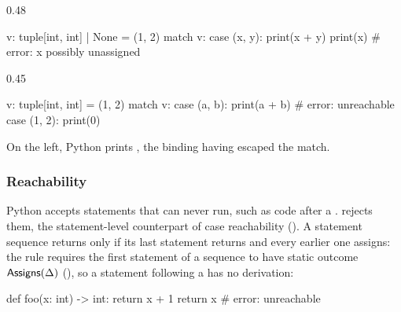 \begin{listingrow}
\begin{listingcol}{0.48\textwidth}
\begin{python}
v: tuple[int, int] | None = (1, 2)
match v:
    case (x, y):
        print(x + y)
print(x)  # error: x possibly unassigned
\end{python}
\end{listingcol}
\begin{listingcol}{0.45\textwidth}
\begin{python}
v: tuple[int, int] = (1, 2)
match v:
    case (a, b):
        print(a + b)
    # error: unreachable
    case (1, 2):
        print(0)
\end{python}
\end{listingcol}
\end{listingrow}

\noindent On the left, Python prints , the binding having escaped the match.

\subsubsection{Reachability}
\label{sec:unreachable}

Python accepts statements that can never run, such as code after a . \PurePy rejects
them, the statement-level counterpart of case reachability (). A statement
sequence returns only if its last statement returns and every earlier one assigns: the 
rule requires the first statement of a sequence to have static outcome $\mathsf{Assigns}(\Delta)$
(), so a statement following a  has no derivation:

\begin{python}
def foo(x: int) -> int:
    return x + 1
    return x  # error: unreachable
\end{python}
